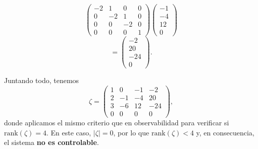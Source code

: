 \documentclass[
  11pt,
  letterpaper,
   addpoints,
   answers
  ]{exam}
\begin{document}
\begin{questions}
\begin{solution}
\begin{equation}
\begin{pmatrix}
-2&1&0&0\\
0&-2&1&0\\
0&0&-2&0\\
0&0&0&1
\end{pmatrix}
\begin{pmatrix}
-1\\ -4\\ 12\\ 0
\end{pmatrix}
\end{equation}
\begin{equation}
=
\begin{pmatrix}
-2\\ 20\\ -24\\ 0
\end{pmatrix}.
\end{equation}

Juntando todo, tenemos
\begin{equation}
\zeta=
\begin{pmatrix}
1&0&-1&-2\\
2&-1&-4&20\\
3&-6&12&-24\\
0&0&0&0
\end{pmatrix},
\end{equation}
 donde aplicamos el mismo criterio que en observabilidad para verificar si
$\mathrm{rank}(\zeta)=4$. En este caso, $|\zeta|=0$, por lo que $\mathrm{rank}(\zeta)<4$ y, en consecuencia, el sistema \textbf{no es controlable}.
\end{solution}
\end{questions}
\end{document}
